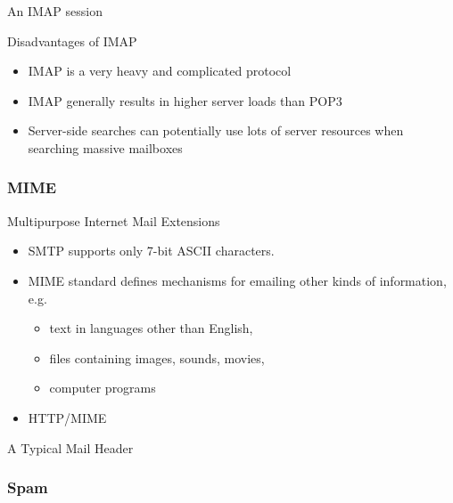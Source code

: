 \begin{frame}{An IMAP session}
  \centering
  \mode<beamer>{ \texttt{[image: imap\_session]} }%
\end{frame}
  
\begin{frame}
  \begin{iblock}{Disadvantages of IMAP}
    \begin{itemize}
    \item IMAP is a very heavy and complicated protocol
    \item IMAP generally results in higher server loads than POP3
    \item Server-side searches can potentially use lots of server resources when searching
      massive mailboxes
    \end{itemize}
  \end{iblock}
\end{frame}

\subsubsection{MIME}

\begin{frame}{Multipurpose Internet Mail Extensions}
  \begin{itemize}
  \item SMTP supports only 7-bit ASCII characters.
  \item MIME standard defines mechanisms for emailing other kinds of information, e.g.
    \begin{itemize}
    \item text in languages other than English,
    \item files containing images, sounds, movies,
    \item computer programs
    \end{itemize}
  \item HTTP/MIME
  \end{itemize}
\end{frame}

\begin{frame}{A Typical Mail Header}
  \centering
  \mode<beamer>{ \texttt{[image: mail\_header]} }%
  \label{fig:mail_header}
\end{frame}

\subsubsection{Spam}

